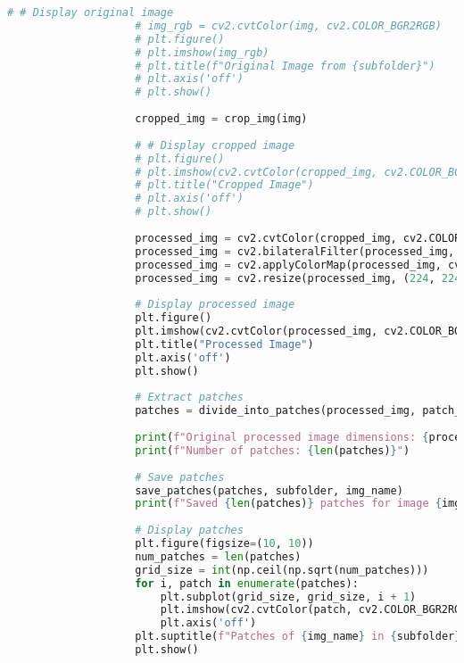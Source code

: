 \begin{lstlisting}[language=Python]
                    # # Display original image
                    # img_rgb = cv2.cvtColor(img, cv2.COLOR_BGR2RGB)
                    # plt.figure()
                    # plt.imshow(img_rgb)
                    # plt.title(f"Original Image from {subfolder}")
                    # plt.axis('off')
                    # plt.show()
    
                    cropped_img = crop_img(img)
    
                    # # Display cropped image
                    # plt.figure()
                    # plt.imshow(cv2.cvtColor(cropped_img, cv2.COLOR_BGR2RGB))
                    # plt.title("Cropped Image")
                    # plt.axis('off')
                    # plt.show()
    
                    processed_img = cv2.cvtColor(cropped_img, cv2.COLOR_RGB2GRAY)
                    processed_img = cv2.bilateralFilter(processed_img, 2, 50, 50)
                    processed_img = cv2.applyColorMap(processed_img, cv2.COLORMAP_BONE)
                    processed_img = cv2.resize(processed_img, (224, 224))
    
                    # Display processed image
                    plt.figure()
                    plt.imshow(cv2.cvtColor(processed_img, cv2.COLOR_BGR2RGB))
                    plt.title("Processed Image")
                    plt.axis('off')
                    plt.show()
    
                    # Extract patches
                    patches = divide_into_patches(processed_img, patch_size)
    
                    print(f"Original processed image dimensions: {processed_img.shape}")
                    print(f"Number of patches: {len(patches)}")
    
                    # Save patches
                    save_patches(patches, subfolder, img_name)
                    print(f"Saved {len(patches)} patches for image {img_name} in {subfolder}")
    
                    # Display patches
                    plt.figure(figsize=(10, 10))
                    num_patches = len(patches)
                    grid_size = int(np.ceil(np.sqrt(num_patches)))
                    for i, patch in enumerate(patches):
                        plt.subplot(grid_size, grid_size, i + 1)
                        plt.imshow(cv2.cvtColor(patch, cv2.COLOR_BGR2RGB))
                        plt.axis('off')
                    plt.suptitle(f"Patches of {img_name} in {subfolder}")
                    plt.show()
    

\end{lstlisting}
